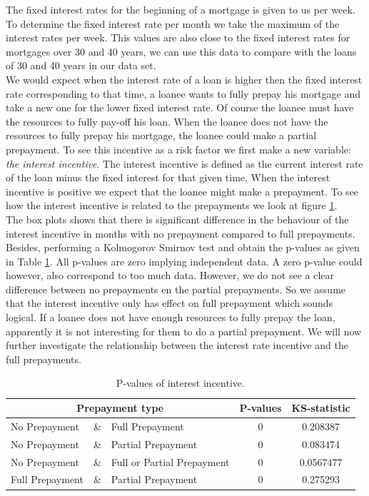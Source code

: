 The fixed interest rates for the beginning of a mortgage is given to us per week. To determine the fixed interest rate per month we take the maximum of the interest rates per week. This values are also close to the fixed interest rates for mortgages over 30 and 40 years, we can use this data to compare with the loans of 30 and 40 years in our data set.
\\
We would expect when the interest rate of a loan is higher then the fixed interest rate corresponding to that time, a loanee wants to fully prepay his mortgage and take a new one for the lower fixed interest rate. Of course the loanee must have the resources to fully pay-off his loan. When the loanee does not have the resources to fully prepay his mortgage, the loanee could make a partial prepayment. To see this incentive as a risk factor we first make a new variable: \textit{the interest incentive}. The interest incentive is defined as the current interest rate of the loan minus the fixed interest for that given time. When the interest incentive is positive we expect that the loanee might make a prepayment. To see how the interest incentive is related to the prepayments we look at figure \ref{pvals_incentive}. \\
The box plots shows that there is significant difference in the behaviour of the interest incentive in months with no prepayment compared to full prepayments. Besides, performing a Kolmogorov Smirnov test and obtain the p-values as given in Table \ref{pvals_incentive}. All p-values are zero implying independent data. A zero p-value could however, also correspond to too much data. 
However, we do not see a clear difference between no prepayments en the partial prepayments. So we assume that the interest incentive only has effect on full prepayment which sounds logical. If a loanee does not have enough resources to fully prepay the loan, apparently it is not interesting for them to do a partial prepayment. We will now further investigate the relationship between the interest rate incentive and the full prepayments.

        \begin{table}[H]
        \centering
            \begin{tabular}{lcl|c|c}
            \multicolumn{3}{c}{Prepayment type} & P-values& KS-statistic \\\hline
            No Prepayment & \& & Full Prepayment & 0 & 0.208387\\
            No Prepayment & \& & Partial Prepayment & 0 & 0.083474\\
            No Prepayment & \& & Full or Partial Prepayment & 0 & 0.0567477 \\
            Full Prepayment & \& & Partial Prepayment & 0 & 0.275293
		    \end{tabular}
            \caption{P-values of interest incentive.}
	        \label{pvals_incentive}
        \end{table}
    
